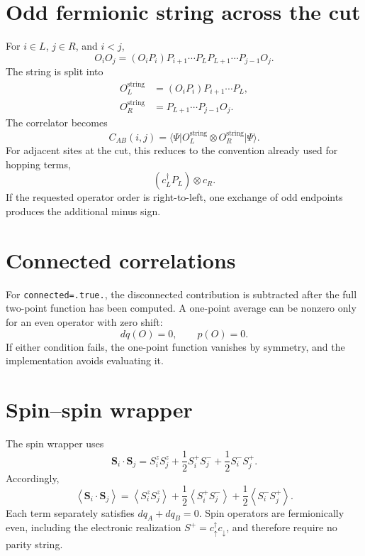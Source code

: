 \documentclass[11pt,a4paper]{article}
\newcommand{\ket}[1]{\lvert #1\rangle}
\newcommand{\bra}[1]{\langle #1\rvert}
\newcommand{\avg}[1]{\left\langle #1\right\rangle}
\begin{document}
\section{Odd fermionic string across the cut}

For $i\in L$, $j\in R$, and $i<j$,
\begin{equation}
  O_iO_j
  =(O_iP_i)P_{i+1}\cdots P_L
   P_{L+1}\cdots P_{j-1}O_j.
\end{equation}
The string is split into
\begin{align}
  O_L^{\mathrm{string}}
  &=(O_iP_i)P_{i+1}\cdots P_L,\\
  O_R^{\mathrm{string}}
  &=P_{L+1}\cdots P_{j-1}O_j.
\end{align}
The correlator becomes
\begin{equation}
  C_{AB}(i,j)
  =\bra{\Psi}
   O_L^{\mathrm{string}}\otimes O_R^{\mathrm{string}}
   \ket{\Psi}.
\end{equation}
For adjacent sites at the cut, this reduces to the convention already used
for hopping terms,
\begin{equation}
  (c_L^\dagger P_L)\otimes c_R.
\end{equation}
If the requested operator order is right-to-left, one exchange of odd
endpoints produces the additional minus sign.

\section{Connected correlations}

For \texttt{connected=.true.}, the disconnected contribution is subtracted
after the full two-point function has been computed.  A one-point average can
be nonzero only for an even operator with zero shift:
\begin{equation}
  dq(O)=0,
  \qquad
  p(O)=0.
\end{equation}
If either condition fails, the one-point function vanishes by symmetry, and
the implementation avoids evaluating it.

\section{Spin--spin wrapper}

The spin wrapper uses
\begin{equation}
  \mathbf S_i\cdot\mathbf S_j
  =S_i^zS_j^z
   +\frac12S_i^+S_j^-
   +\frac12S_i^-S_j^+.
\end{equation}
Accordingly,
\begin{equation}
  \avg{\mathbf S_i\cdot\mathbf S_j}
  =\avg{S_i^zS_j^z}
   +\frac12\avg{S_i^+S_j^-}
   +\frac12\avg{S_i^-S_j^+}.
\end{equation}
Each term separately satisfies $dq_A+dq_B=0$.  Spin operators are
fermionically even, including the electronic realization
$S^+=c^\dagger_\uparrow c_\downarrow$, and therefore require no parity
string.
\end{document}
